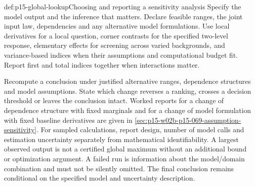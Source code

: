 \begin{hbmethod}{def:p15-global-lookup}{Choosing and reporting a sensitivity analysis}
Specify the model output and the inference that matters.
Declare feasible ranges, the joint input law, dependencies and any
alternative model formulations. Use local derivatives for a local
question, corner contrasts for the specified two-level response,
elementary effects for screening across varied backgrounds, and
variance-based indices when their assumptions and computational budget fit.
Report first and total indices together when interactions matter.

Recompute a conclusion under justified alternative ranges, dependence
structures and model assumptions. State which change reverses a ranking,
crosses a decision threshold or leaves the conclusion intact.
Worked reports for a change of dependence structure with fixed marginals
and for a change of model formulation with fixed baseline derivatives are
given in \cref{sec:p15-w02b-p15-069-assumption-sensitivity}.
For sampled calculations, report design, number of model calls and
estimation uncertainty separately from mathematical identifiability.
A largest observed output is not a certified global maximum without
an additional bound or optimization argument.
A failed run is information about the model/domain combination and must
not be silently omitted. The final conclusion remains conditional on
the specified model and uncertainty description.
\end{hbmethod}
